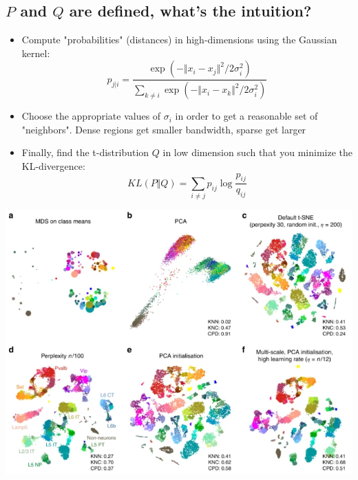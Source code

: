 \documentclass[10pt]{article}
\begin{document}
\subsection*{$P$ and $Q$ are defined, what's the intuition?}
\begin{itemize}
    \item Compute "probabilities" (distances) in high-dimensions using the Gaussian kernel:
    \[p_{j \vert i} = \frac{\exp( - \Vert x_i - x_j \Vert^2 / 2 \sigma_i^2)}{\sum_{k \neq i} \exp(- \Vert x_i - x_k \Vert^2 / 2 \sigma_i^2)}\]
    \item Choose the appropriate values of $\sigma_i$ in order to get a reasonable set of "neighbors".  Dense regions get smaller bandwidth, sparse get larger
    \item Finally, find the t-distribution $Q$ in low dimension such that you minimize the KL-divergence:
    \[KL(P \Vert Q) = \sum_{i \neq j} p_{ij} \log \frac{p_{ij}}{q_{ij}}\]
\end{itemize}
\begin{center}
    \includegraphics*[scale=0.8]{W8_10.png}
\end{center}
\end{document}

